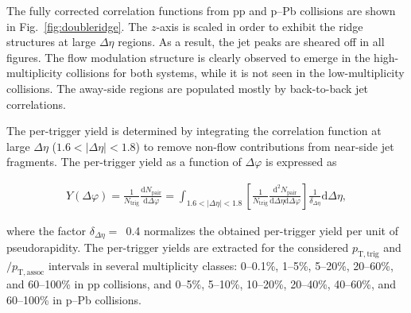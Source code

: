 The fully corrected correlation functions from pp and p--Pb collisions are shown in Fig.~\ref{fig:doubleridge}. 
The $z$-axis is scaled in order to exhibit the ridge structures at large $\Delta\eta$ regions. As a result, the jet peaks are sheared off in all figures. The flow modulation structure is clearly observed to emerge in the high-multiplicity collisions for both systems, while it is not seen in the low-multiplicity collisions. The away-side regions are populated mostly by back-to-back jet correlations. 

The per-trigger yield is determined by integrating the correlation function at large $\Delta\eta$ ($1.6<|\Delta\eta|<1.8$) to remove non-flow contributions from near-side jet fragments.
The per-trigger yield as a function of $\Delta\varphi$ is expressed as

\begin{eqnarray}
Y(\Delta\varphi) = \frac{1}{N_{\mathrm{trig}}} \frac{\mathrm{d} N_{\mathrm{pair}}}{\mathrm{d}\Delta\varphi} = \int_{1.6<|\Delta \eta|<1.8} \left[\frac{1}{N_{\mathrm{trig}}} \frac{\mathrm{d}^{2}N_{\mathrm{pair}}}{\mathrm{d}\Delta\eta \mathrm{d}\Delta\varphi}\right] \frac{1}{\delta_{\Delta\eta}} \mathrm{d}\Delta \eta,
\label{eq:pertrigger}
\end{eqnarray}

where the factor $\delta_{\Delta\eta}=$~0.4 normalizes the obtained per-trigger yield per unit of pseudorapidity.
The per-trigger yields are extracted for the considered $p_{\mathrm{T,trig}}$ and $/p_{\mathrm{T,assoc}}$ intervals in several multiplicity classes: 0--0.1\%, 1--5\%, 5--20\%, 20--60\%, and 60--100\% in pp collisions, and 0--5\%, 5--10\%, 10--20\%, 20--40\%, 40--60\%, and 60--100\% in p--Pb collisions.  


